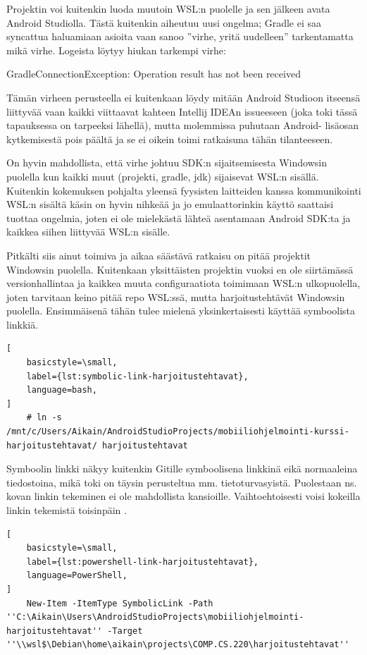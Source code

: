 Projektin voi kuitenkin luoda muutoin WSL:n puolelle ja sen jälkeen avata
Android Studiolla. Tästä kuitenkin aiheutuu uusi ongelma; Gradle ei saa
syncattua haluamiaan asioita vaan sanoo ''virhe, yritä uudelleen'' tarkentamatta
mikä virhe. Logeista löytyy hiukan tarkempi virhe:

\begin{displayquote}
GradleConnectionException: Operation result has not been received
\end{displayquote}

Tämän virheen perusteella ei kuitenkaan löydy mitään Android Studioon itseensä
liittyvää vaan kaikki viittaavat kahteen Intellij IDEAn issueeseen (joka toki
tässä tapauksessa on tarpeeksi lähellä), mutta molemmissa puhutaan Android-
lisäosan kytkemisestä pois päältä ja se ei oikein toimi ratkaisuna tähän
tilanteeseen.

On hyvin mahdollista, että virhe johtuu SDK:n sijaitsemisesta Windowsin
puolella kun kaikki muut (projekti, gradle, jdk) sijaisevat WSL:n sisällä.
Kuitenkin kokemuksen pohjalta yleensä fyysisten laitteiden kanssa kommunikointi
WSL:n sisältä käsin on hyvin nihkeää ja jo emulaattorinkin käyttö saattaisi
tuottaa ongelmia, joten ei ole mielekästä lähteä asentamaan Android SDK:ta ja
kaikkea siihen liittyvää WSL:n sisälle.

Pitkälti siis ainut toimiva ja aikaa säästävä ratkaisu on pitää projektit
Windowsin puolella. Kuitenkaan yksittäisten projektin vuoksi en ole siirtämässä
versionhallintaa ja kaikkea muuta configuraatiota toimimaan WSL:n ulkopuolella,
joten tarvitaan keino pitää repo WSL:ssä, mutta harjoitustehtävät Windowsin
puolella. Ensimmäisenä tähän tulee mielenä yksinkertaisesti käyttää symboolista
linkkiä.

\begin{lstlisting}[
    basicstyle=\small,
    label={lst:symbolic-link-harjoitustehtavat},
    language=bash,
]
    # ln -s /mnt/c/Users/Aikain/AndroidStudioProjects/mobiiliohjelmointi-kurssi-harjoitustehtavat/ harjoitustehtavat
\end{lstlisting}

Symboolin linkki näkyy kuitenkin Gitille symboolisena linkkinä eikä normaaleina
tiedostoina, mikä toki on täysin perusteltua mm. tietoturvasyistä. Puolestaan
ns. kovan linkin tekeminen ei ole mahdollista kansioille. Vaihtoehtoisesti
voisi kokeilla linkin tekemistä toisinpäin
\parencite{StackoverflowWSLSymlink}.

\begin{lstlisting}[
    basicstyle=\small,
    label={lst:powershell-link-harjoitustehtavat},
    language=PowerShell,
]
    New-Item -ItemType SymbolicLink -Path ''C:\Aikain\Users\AndroidStudioProjects\mobiiliohjelmointi-harjoitustehtavat'' -Target ''\\wsl$\Debian\home\aikain\projects\COMP.CS.220\harjoitustehtavat''
\end{lstlisting}

